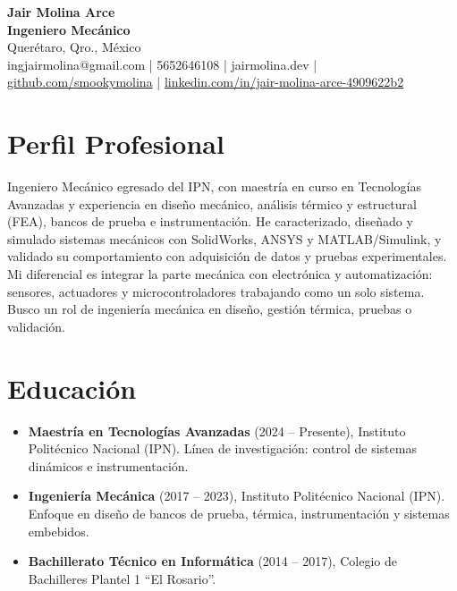 \documentclass[10pt,a4paper]{article}
\begin{document}
\pagestyle{empty}

\begin{center}
    {\huge \textbf{Jair Molina Arce}} \\
    \vspace{2mm}
    {\Large \textbf{Ingeniero Mecánico}} \\
    \vspace{2mm}
    Querétaro, Qro., México \\
    ingjairmolina@gmail.com | 5652646108 | jairmolina.dev | \href{https://github.com/smookymolina}{github.com/smookymolina} | \href{https://linkedin.com/in/jair-molina-arce-4909622b2}{linkedin.com/in/jair-molina-arce-4909622b2}
\end{center}

\section*{Perfil Profesional}
Ingeniero Mecánico egresado del IPN, con maestría en curso en Tecnologías Avanzadas y experiencia en diseño mecánico, análisis térmico y estructural (FEA), bancos de prueba e instrumentación. He caracterizado, diseñado y simulado sistemas mecánicos con SolidWorks, ANSYS y MATLAB/Simulink, y validado su comportamiento con adquisición de datos y pruebas experimentales. Mi diferencial es integrar la parte mecánica con electrónica y automatización: sensores, actuadores y microcontroladores trabajando como un solo sistema. Busco un rol de ingeniería mecánica en diseño, gestión térmica, pruebas o validación.

\section*{Educación}
\begin{itemize}[leftmargin=*, noitemsep]
    \item \textbf{Maestría en Tecnologías Avanzadas} (2024 -- Presente), Instituto Politécnico Nacional (IPN). Línea de investigación: control de sistemas dinámicos e instrumentación.
    \item \textbf{Ingeniería Mecánica} (2017 -- 2023), Instituto Politécnico Nacional (IPN). Enfoque en diseño de bancos de prueba, térmica, instrumentación y sistemas embebidos.
    \item \textbf{Bachillerato Técnico en Informática} (2014 -- 2017), Colegio de Bachilleres Plantel 1 ``El Rosario''.
\end{itemize}
\end{document}
